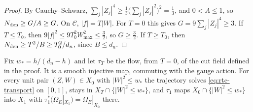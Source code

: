 \begin{proof}
By Cauchy--Schwarz, $\sum_j|Z_j|^4\ge\frac13\big(\sum_j|Z_j|^2\big)^2=\frac13$, and $0<A\le1$, so $N_{\rm den}\ge G/A\ge G$. On $\mathcal C$,
$|f|=T|W|$. For $T=0$ this gives $G=9\sum_j|Z_j|^4\ge3$. If $T\le T_0$, then $9|f|^2\le9T_0^2W_{\max}^2\le\frac32$, so $G\ge\frac32$. If
$T\ge T_0$, then $N_{\rm den}\ge T^2/B\ge T_0^2/d_n$, since $B\le d_n$.
\end{proof}

\begin{proposition}\label{prop:rtc-transport}
Fix $w_*=h/(d_n-h)$ and let $\tau_T$ be the flow, from $T=0$, of the cut field defined in the proof. It is a smooth
injective map, commuting with the gauge action. For every unit pair $(Z,W)\in X_0$ with $|W|^2\le w_*$ the trajectory
solves \eqref{eq:rtc-transport} on $[0,1]$, stays in $X_T\cap\{|W|^2\le w_*\}$, and $\tau_1$ maps
$X_0\cap\{|W|^2\le w_*\}$ into $X_1$ with $\tau_1^*(\Omega_E|_{X_1})=\Omega_E|_{X_0}$ there.
\end{proposition}
